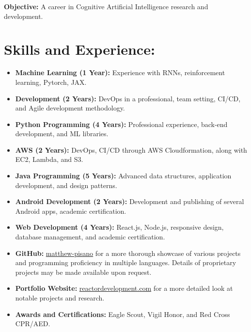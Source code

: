 \pagestyle{plain} 
\maketitle
\vspace{-0.4in}
\hspace*{-0.3in}
\textbf{Objective:} A career in Cognitive Artificial Intelligence research and development. 

\section*{Skills and Experience:}
\begin{itemize}
    \itemsep0em 
    \item \textbf{Machine Learning (1 Year):} Experience with RNNs, reinforcement learning, Pytorch, JAX.
    \item \textbf{Development (2 Years):} DevOps in a professional, team setting, CI/CD, and Agile development methodology. 
    \item \textbf{Python Programming (4 Years):} Professional experience, back-end development, and ML libraries.
    \item \textbf{AWS (2 Years):} DevOps, CI/CD through AWS Cloudformation, along with EC2, Lambda, and S3.
    \item \textbf{Java Programming (5 Years):} Advanced data structures, application development, and design patterns.
    \item \textbf{Android Development (2 Years):} Development and publishing of several Android apps, academic certification.
    \item \textbf{Web Development (4 Years):} React.js, Node.js, responsive design, database management, and academic certification.
    \item \textbf{GitHub:} \href{https://github.com/matthew-pisano}{matthew-pisano} for a more thorough 
        showcase of various projects and programming proficiency in multiple languages.  
        Details of proprietary projects may be made available upon request.
    \item \textbf{Portfolio Website:} \href{https://reactordevelopment.com}{reactordevelopment.com} for a 
        more detailed look at notable projects and research.
    \item \textbf{Awards and Certifications:} Eagle Scout, Vigil Honor, and Red Cross CPR/AED.
\end{itemize}

